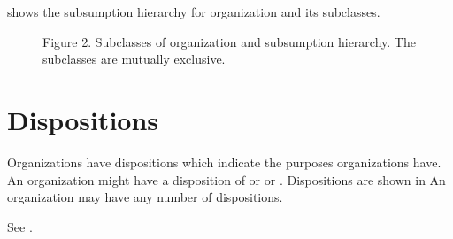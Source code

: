 \documentclass[letterpaper,10pt,english]{sphinxmanual}
\begin{document}
\sphinxAtStartPar
{\hyperref[\detokenize{organizations:figure-2}]{}} shows the subsumption hierarchy for organization and its subclasses.

\begin{figure}[htbp]
\centering
\capstart

\noindent{}
\caption{Figure 2.  Subclasses of organization and subsumption hierarchy.  The subclasses are
mutually exclusive.}\label{\detokenize{organizations:id7}}\label{\detokenize{organizations:figure-2}}\end{figure}


\section{Dispositions}
\label{\detokenize{organizations:dispositions}}
\sphinxAtStartPar
Organizations have dispositions which indicate the purposes organizations have.  An
organization might have a disposition of  or  or .
Dispositions are shown in {\hyperref[\detokenize{organizations:table-2}]{}}  An organization may have any number
of dispositions.

\sphinxAtStartPar
See {\hyperref[\detokenize{organizations:table-2}]{}}.
\end{document}
